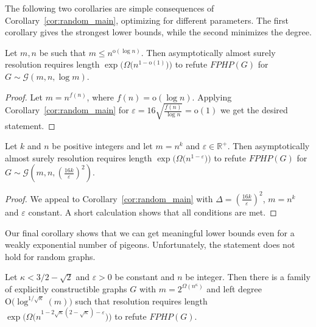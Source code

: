 \documentclass{theoretics}
\newcommand{\Bigoh}[1]{\mathrm{O} \bigl( #1 \bigr)}
\newcommand{\littleoh}[1]{\mathrm{o} ( #1 )}
\newcommand{\Bigomega}[1]{\Omega \bigl( #1 \bigr)}
\newcommand{\bigomega}[1]{\Omega ( #1 )}
\newcommand{\Rplus}     {\mathbb{R}^{+}}
\newcommand{\refth}[1]{Theorem~\ref{#1}}
\newcommand{\refcor}[1]{Corollary~\ref{#1}}
\newcommand{\formulaformat}[1]{\mathit{#1}}
\newcommand{\graphfphpnot}[1][G]{\formulaformat{FPHP}({#1})}
\newcommand{\GFPHP}{G\text{-}FPHP}
\renewcommand{\GFPHP}{\graphfphpnot[G]}
\newcommand{\GdegMax}{\Delta}
\newcommand{\gdegmax}{\GdegMax}
\newcommand{\Gdist}{\mathcal{G}}
\newcommand{\exponentalpha}{\varepsilon}
\numberwithin{equation}{section}
\begin{document}
The following two corollaries are simple consequences of 
\refcor{cor:random_main}, optimizing
 for different parameters. The first corollary gives the
strongest lower bounds, while the second
minimizes the degree.

\begin{corollary}
  Let $m, n$ be such that
  $m \le n^{\littleoh{\log n}}$.
  Then asymptotically almost surely
  resolution requires length 
  $\exp \bigl( \Bigomega{n^{1-\littleoh{1}}} \bigr)$ to refute $\GFPHP$ 
	for $G \sim \Gdist \left(m,n,\log m\right)$.
\end{corollary}

\begin{proof}
  Let $m = n^{f(n)}$, where $f(n) = \littleoh{\log n}$. Applying
  \refcor{cor:random_main} for 
  $\exponentalpha = 16 \sqrt{\frac{f(n)}{\log n}} = \littleoh{1}$
  we get the desired statement.
\end{proof}



\begin{corollary}[Restatement of \refth{th:informal-poly-npigeons}]
  Let $k$ and $n$ 
  be positive integers and
  let $m = n^k$
  and
  $\exponentalpha \in \Rplus$.
  Then asymptotically almost surely
  resolution requires length 
  $\exp \bigl(\Bigomega{n^{1-\exponentalpha}}\bigr)$ to refute $\GFPHP$ 
  for 
  $G \sim \Gdist 
  \left(m, n, \left( \frac{16 k}{\exponentalpha} \right)^2 \right)$.
\end{corollary}

\begin{proof}
  We appeal to \refcor{cor:random_main} with 
  $\gdegmax = \left( \frac{16 k}{\varepsilon} \right)^2$,
  $m = n^{k}$ and 
  $\exponentalpha$ constant.
  A short calculation shows that all conditions are met.
\end{proof}



Our final corollary shows that we can get 
meaningful lower bounds even
for
a weakly exponential number of pigeons. Unfortunately,
the statement does not hold for random graphs.

\begin{corollary}\label{cor:main_subexp}
  Let $\kappa < 3/2 - \sqrt{2}$ and $\exponentalpha > 0$ be constant and
  $n$ be integer. Then
  there is a family of 
  explicitly constructible
  graphs $G$ with 
  $m = 2^{\bigomega{n^\kappa}}$ and
  left degree $\Bigoh{\log^{1 / \sqrt{\kappa}}(m)}$
  such that resolution requires
  length
  $
  \exp
  \bigl(
  \Bigomega{n^{1-2\sqrt{\kappa}(2 - \sqrt{\kappa}) - \exponentalpha}}
  \bigr)
  $
  to refute $\GFPHP$.
\end{corollary}
\end{document}
